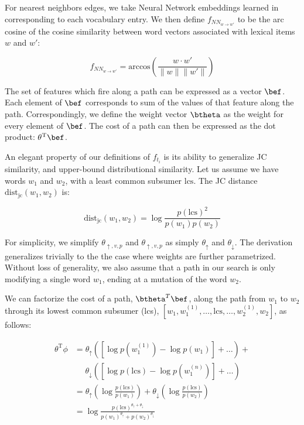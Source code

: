 For nearest neighbors edges, we take Neural Network embeddings learned
  in  corresponding to each vocabulary entry.
We then define $f_{NN_{w \rightarrow w'}}$
  to be the arc cosine of the cosine similarity between word vectors
  associated with lexical items $w$ and $w'$:

\begin{equation*}
  f_{NN_{w \rightarrow w'}}
    = \textrm{arccos} \left( \frac{w \cdot w'}{\|w\| \|w'\|} \right)
\end{equation*}

The set of features which fire along a path
  can be expressed as a vector $\bef$.
Each element of $\bef$ corresponds to sum of the values of that
  feature along the path.
Correspondingly, we define the weight vector $\btheta$ as the
  weight for every element of $\bef$.
The cost of a path can then be expressed as the dot product:
  $\theta^{\textrm{T}}\bef$.

%
%
An elegant property of our definitions of $f_{t_i}$ is its ability to
  generalize JC similarity, and upper-bound distributional similarity.
Let us assume we have words $w_1$ and $w_2$, with a least common subsumer $\textrm{lcs}$.
The JC distance $\textrm{dist}_{\textrm{jc}}(w_1, w_2)$ is:

\begin{equation}
\textrm{dist}_{\textrm{jc}}(w_1, w_2)
  = \log\frac{p(\textrm{lcs})^2}{p(w_1)p(w_2)}
\label{eqn:jc}
\end{equation}

For simplicity, we simplify $\theta_{\uparrow,v,p}$ and $\theta_{\uparrow,v,p}$
  as simply $\theta_\uparrow$ and $\theta_\downarrow$.
The derivation generalizes trivially to the the case where weights are
  further parametrized.
Without loss of generality, we also assume that a path in our search
  is only modifying a single word $w_1$, ending at a mutation of the
  word $w_2$.

We can factorize the cost of a path, $\btheta^{T}\bef$, along the path
  from $w_1$ to $w_2$ through its lowest common subsumer (lcs),
  $[w_1, w_1^{(1)}, \dots, \textrm{lcs}, \dots,  w_2^{(1)}, w_2]$,
  as follows:

\begin{align*}
\theta^{\textrm{T}}\phi
  &= \theta_\uparrow \left( 
    \left[\log p(w_1^{(1)}) - \log p(w_1)\right] +
    \dots
    \right) + \\
  &~~~~~~ \theta_\downarrow \left( 
    \left[\log p(\textrm{lcs}) - \log p(w_1^{(n)}) \right] +
    \dots
    \right) \\
  &= \theta_\uparrow \left( \log \frac{p(\textrm{lcs})}{p(w_1)} \right) +
     \theta_\downarrow \left( \log \frac{p(\textrm{lcs})}{p(w_2)} \right) \\
  &= \log \frac{ p(\textrm{lcs})^{\theta_\uparrow + \theta_\downarrow} }
               { p(w_1)^{\theta_\uparrow} + p(w_2)^{\theta_\downarrow} }
\end{align*}

